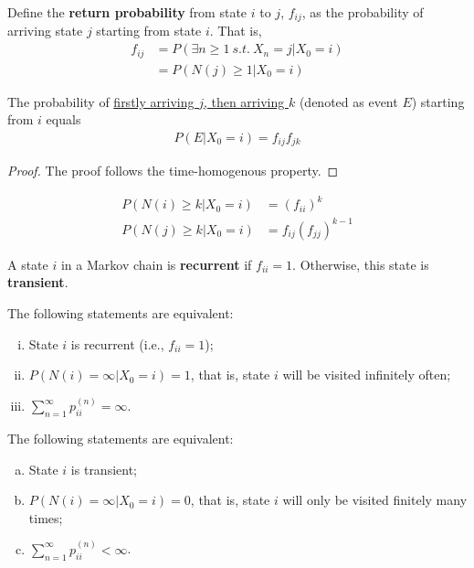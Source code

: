 \documentclass{article}
\begin{document}
    \begin{definition}
    	Define the \textbf{return probability} from state $i$ to $j$, $f_{ij}$, as the probability of arriving state $j$ starting from state $i$. That is,
    	\begin{align}
    		f_{ij} &= P(\exists n \geq 1\ s.t.\ X_n = j | X_0 = i) \\
    		&= P(N(j) \geq 1 | X_0 = i)
    	\end{align}
    \end{definition}
    
    \begin{proposition}
    	The probability of \ul{firstly arriving $j$, then arriving $k$} (denoted as event $E$) starting from $i$ equals
    	\begin{align}
    		P(E|X_0=i) = f_{ij} f_{jk}
    	\end{align}
    \end{proposition}
    
    \begin{proof}
    	The proof follows the time-homogenous property.
    \end{proof}
    
    \begin{corollary}
    	\begin{align}
    		P(N(i) \geq k| X_0 = i) &= (f_{ii})^k \\
    		P(N(j) \geq k| X_0 = i) &= f_{ij}(f_{jj})^{k-1}
    	\end{align}
    \end{corollary}
    
    \begin{definition}
    	A state $i$ in a Markov chain is \textbf{recurrent} if $f_{ii} = 1$. Otherwise, this state is \textbf{transient}.
    \end{definition}
    
    \begin{theorem}
    	The following statements are equivalent:
    	\begin{enumerate}[(i)]
    		\item State $i$ is recurrent (i.e., $f_{ii}=1$);
    		\item $P(N(i) = \infty|X_0=i) = 1$, that is, state $i$ will be visited infinitely often;
    		\item $\sum_{n=1}^\infty p_{ii}^{(n)} = \infty$.
    	\end{enumerate}
    	The following statements are equivalent:
    	\begin{enumerate}[(a)]
    		\item State $i$ is transient;
    		\item $P(N(i) = \infty|X_0=i) = 0$, that is, state $i$ will only be visited finitely many times;
    		\item $\sum_{n=1}^\infty p_{ii}^{(n)} < \infty$.
    	\end{enumerate}
    \end{theorem}
\end{document}
